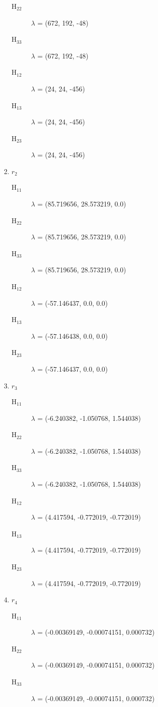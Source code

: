 \documentclass[a4paper]{article}
\begin{document}
\begin{enumerate}
\begin{enumerate}
\begin{description}
\item[{H$_{\text{22}}$}] $\lambda$ = (672, 192, -48)
\item[{H$_{\text{33}}$}] $\lambda$ = (672, 192, -48)
\item[{H$_{\text{12}}$}] $\lambda$ = (24, 24, -456)
\item[{H$_{\text{13}}$}] $\lambda$ = (24, 24, -456)
\item[{H$_{\text{23}}$}] $\lambda$ = (24, 24, -456)
\end{description}
\item \(r_2\)
\label{sec-1-5-1-3-2}
\begin{description}
\item[{H$_{\text{11}}$}] $\lambda$ = (85.719656, 28.573219, 0.0)
\item[{H$_{\text{22}}$}] $\lambda$ = (85.719656, 28.573219, 0.0)
\item[{H$_{\text{33}}$}] $\lambda$ = (85.719656, 28.573219, 0.0)
\item[{H$_{\text{12}}$}] $\lambda$ = (-57.146437, 0.0, 0.0)
\item[{H$_{\text{13}}$}] $\lambda$ = (-57.146438, 0.0, 0.0)
\item[{H$_{\text{23}}$}] $\lambda$ = (-57.146437, 0.0, 0.0)
\end{description}
\item \(r_3\)
\label{sec-1-5-1-3-3}
\begin{description}
\item[{H$_{\text{11}}$}] $\lambda$ = (-6.240382, -1.050768, 1.544038)
\item[{H$_{\text{22}}$}] $\lambda$ = (-6.240382, -1.050768, 1.544038)
\item[{H$_{\text{33}}$}] $\lambda$ = (-6.240382, -1.050768, 1.544038)
\item[{H$_{\text{12}}$}] $\lambda$ = (4.417594, -0.772019, -0.772019)
\item[{H$_{\text{13}}$}] $\lambda$ = (4.417594, -0.772019, -0.772019)
\item[{H$_{\text{23}}$}] $\lambda$ = (4.417594, -0.772019, -0.772019)
\end{description}
\item \(r_4\)
\label{sec-1-5-1-3-4}
\begin{description}
\item[{H$_{\text{11}}$}] $\lambda$ = (-0.00369149, -0.00074151, 0.000732)
\item[{H$_{\text{22}}$}] $\lambda$ = (-0.00369149, -0.00074151, 0.000732)
\item[{H$_{\text{33}}$}] $\lambda$ = (-0.00369149, -0.00074151, 0.000732)

\end{description}
\end{enumerate}
\end{enumerate}
\end{document}
